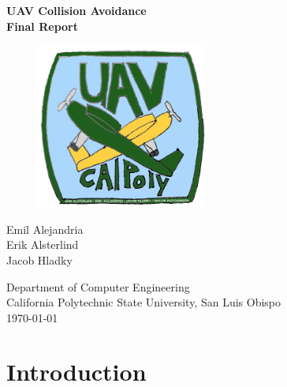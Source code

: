 \documentclass[12pt]{article}
\begin{document}
\begin{titlepage}
  \begin{center}
    \vspace*{1cm}
    \Huge{\textbf{
        UAV Collision Avoidance\\
        Final Report
    }}

    \vspace*{1.5cm}

    \begin{figure}[ht!]
      \centering
      \includegraphics[width=0.5\textwidth]{logo.png}
    \end{figure}

    \vfill
    \large{
      Emil Alejandria\\
      Erik Alsterlind\\
      Jacob Hladky\\
    }

    \vspace{1cm}

    \large{
      Department of Computer Engineering\\
      California Polytechnic State University, San Luis Obispo\\
      \today
    }

  \end{center}
\end{titlepage}


\tableofcontents


\section{Introduction}
\end{document}
